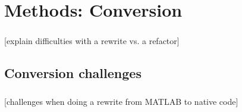 \documentclass{beamer}
\newcommand{\tbackground}[1]{#1}
\newcommand{\tbackground}[1]{\textcolor{tbackground}{#1}}
\begin{document}

\section{Methods: Conversion}
\begin{frame}\frametitle{\secname}
	[\tbackground{explain difficulties with a rewrite vs. a refactor}]
\end{frame}

\subsection{Conversion challenges}
\begin{frame}\frametitle{\subsecname}
	[\tbackground{challenges when doing a rewrite from MATLAB to native code}]
\end{frame}
\end{document}
